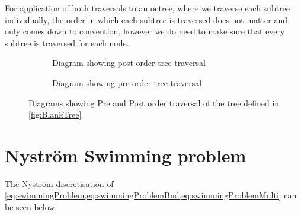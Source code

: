 For application of both traversals to an octree, where we traverse each subtree individually, the order in which each subtree is traversed does not matter and only comes down to convention, however we do need to make sure that every subtree is traversed for each node.


\begin{figure}
     \centering
     \begin{subfigure}[b]{0.49\textwidth}
         \centering
         \resizebox{\linewidth}{!}{}
         \caption{Diagram showing post-order tree traversal}
         \label{fig:Postorder}
     \end{subfigure}
          \hfill
     \begin{subfigure}[b]{0.49\textwidth}
         \centering
         \resizebox{\linewidth}{!}{}
         \caption{Diagram showing pre-order tree traversal}
         \label{fig:Preorder}
     \end{subfigure}
        \caption{Diagrams showing Pre and Post order traversal of the tree defined in \cref{fig:BlankTree}}
        \label{fig:TreeTraversal}
\end{figure}


\FloatBarrier
\section{Nyström Swimming problem} \label{appedix:NystromSwim}
The Nyström discretisation of \cref{eq:swimmingProblem,eq:swimmingProblemBnd,eq:swimmingProblemMulti} can be seen below. 

